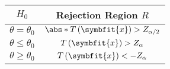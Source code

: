 \documentclass{article}
\begin{document}
\begin{multicols}{3}
\begin{minipage}{70mm}
\begin{table}[H]
    \centering
    \begin{tabular}{cc}
        \toprule
        \(H_0\) & \textbf{Rejection Region} \(R\)                       \\
        \midrule
        \(\theta = \theta_0\)            & \(\abs*{T\left( \symbfit{x} \right)} > Z_{\alpha/2}\) \\
        \(\theta \leq \theta_0\)         & \(T\left( \symbfit{x} \right) > Z_{\alpha}\)          \\
        \(\theta \geq \theta_0\)         & \(T\left( \symbfit{x} \right) < -Z_{\alpha}\)         \\
        \bottomrule
    \end{tabular}
\end{table}
\end{minipage}



\end{multicols}
\end{document}
